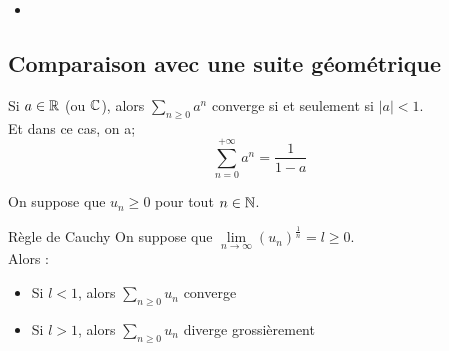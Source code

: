 \documentclass[../main.tex]{subfile}
\begin{document}
\begin{ex}
\begin{itemize}	
	\item 
\end{itemize}
\end{ex}

\subsection{Comparaison avec une suite géométrique}

\begin{rap}
	Si $a \in \mathbb{R}$ (ou $\mathbb{C}$), alors $\sum\limits_{n \geq 0} a^n$ converge si et seulement si $|a| < 1$.\\
	Et dans ce cas, on a;
	$$\sum\limits_{n=0}^{+\infty} a^n = \frac{1}{1 - a}$$
\end{rap}

On suppose que $u_n \geq 0$ pour tout $n \in \mathbb{N}$.\\

\begin{theo}{Règle de Cauchy}
	On suppose que $\lim\limits_{n \to \infty} (u_n)^{\frac{1}{n}} = l \geq 0$.\\
	Alors :
\begin{itemize}	
	\item Si $l < 1$, alors $\sum\limits_{n \geq 0} u_n$ converge
	\item Si $l > 1$, alors $\sum\limits_{n \geq 0} u_n$ diverge grossièrement
\end{itemize}
\end{theo}
\end{document}
